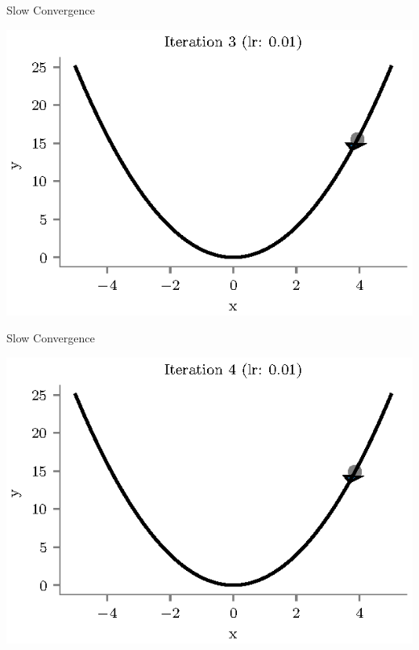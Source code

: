 \documentclass{beamer}
\begin{document}
\begin{frame}{Slow Convergence}
\begin{center}
\includegraphics[totalheight=6cm]{gradient-descent/undershooting-3.eps}
\end{center}
\end{frame}

\begin{frame}{Slow Convergence}
\begin{center}
\includegraphics[totalheight=6cm]{gradient-descent/undershooting-4.eps}
\end{center}
\end{frame}
\end{document}
